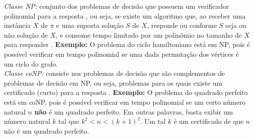 \textit{Classe NP:} conjunto dos problemas de decisão que possuem um verificador polinomial para a resposta , ou seja, se existe um algoritmo que, ao receber uma instância $X$ de $\pi$ e uma suposta solução $S$ de $X$, responde  ou  conforme $S$ seja ou não solução de $X$,  e  consome tempo limitado por um polinômio no tamanho de $X$ para responder . \textbf{Exemplo:} O problema do ciclo hamiltoniano está em NP, pois é possível verificar em tempo polinomial se uma dada permutação dos vértices é um ciclo do grafo.\\

\textit{Classe coNP:} consiste nos problemas de decisão que são complementos de problemas de decisão em NP, ou seja, problemas para os quais existe um certificado (curto) para a resposta . \textbf{Exemplo:} O problema do quadrado perfeito está em coNP,  pois é possível verificar em tempo polinomial se um certo número natural $n$ \textbf{não} é um quadrado perfeito. Em outras palavras, basta exibir um número natural $k$ tal que $k^2 < n < (k+1)^2$.  Um tal $k$ é um certificado de que $n$ não é um quadrado perfeito.\\[6pt]